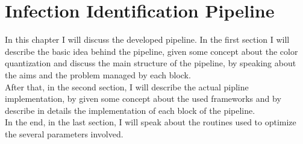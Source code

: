 \documentclass{standalone}
\begin{document}
	\chapter{Infection Identification Pipeline}
	
	
	In this chapter I will discuss the developed pipeline. In the first section I will describe the basic idea behind the pipeline, given some concept about the color quantization and discuss the main structure of the pipeline, by speaking about the aims and the problem managed by each block.\\
	After that, in the second section, I will describe the actual pipline implementation, by given some concept about the used frameworks and by describe in details the implementation of each block of the pipeline.\\
	In the end, in the last section, I will speak about the routines used to optimize the several parameters involved.\\
	
	
\end{document}
